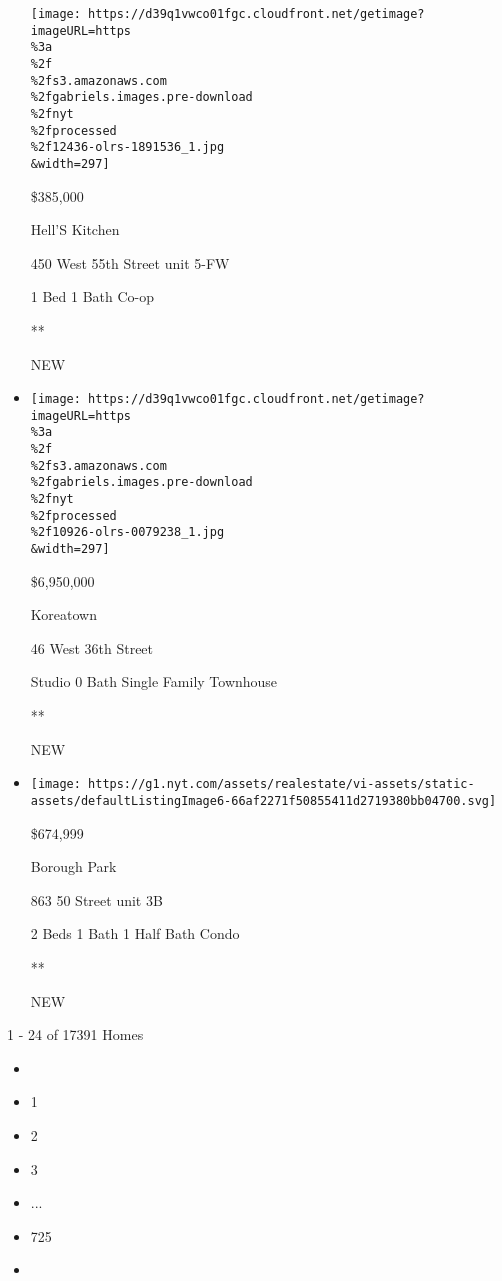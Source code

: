 \begin{itemize}
  \texttt{[image: https://d39q1vwco01fgc.cloudfront.net/getimage?imageURL=https\\\%3a\\\%2f\\\%2fs3.amazonaws.com\\\%2fgabriels.images.pre-download\\\%2fnyt\\\%2fprocessed\\\%2f12436-olrs-1891536\_1.jpg\\\&width=297]}

  \$385,000

  Hell'S Kitchen

  450 West 55th Street unit 5-FW

  1 Bed \textbar{} 1 Bath \textbar{} Co-op

  **

  NEW
\item
  \href{/real-estate/usa/ny/new-york/koreatown/homes-for-sale/46-west-36th-street/10926-OLRS-0079238?}{}

  \texttt{[image: https://d39q1vwco01fgc.cloudfront.net/getimage?imageURL=https\\\%3a\\\%2f\\\%2fs3.amazonaws.com\\\%2fgabriels.images.pre-download\\\%2fnyt\\\%2fprocessed\\\%2f10926-olrs-0079238\_1.jpg\\\&width=297]}

  \$6,950,000

  Koreatown

  46 West 36th Street

  Studio \textbar{} 0 Bath \textbar{} Single Family Townhouse

  **

  NEW
\item
  \href{/real-estate/usa/ny/brooklyn/borough-park/homes-for-sale/863-50-street/15091-5522733?}{}

  \texttt{[image: https://g1.nyt.com/assets/realestate/vi-assets/static-assets/defaultListingImage6-66af2271f50855411d2719380bb04700.svg]}

  \$674,999

  Borough Park

  863 50 Street unit 3B

  2 Beds \textbar{} 1 Bath \textbar{} 1 Half Bath \textbar{} Condo

  **

  NEW
\end{itemize}

1 - 24 of 17391 Homes

\begin{itemize}
\item
\item
  1
\item
  2
\item
  3
\item
  ...
\item
  725
\item
\end{itemize}

